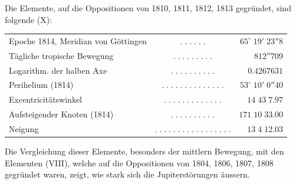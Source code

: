 \par\indent Die Elemente, auf die Oppositionen von 1810, 1811, 1812, 1813 gegründet, sind folgende (X):
\begin{center}\fontsize{9}{11}\selectfont\setlength{\tabcolsep}{2pt}\renewcommand{\arraystretch}{1.15}\begin{tabular}{lcr}
Epoche 1814, Meridian von Göttingen & $.\;.\;.\;.\;.\;.$ & $65^\circ\;19'\;23''8$\\
Tägliche tropische Bewegung & $.\;.\;.\;.\;.\;.\;.\;.\;.$ & $812''709$\\
Logarithm. der halben Axe & $.\;.\;.\;.\;.\;.\;.\;.\;.\;.$ & $0.4267631$\\
Perihelium (1814) & $.\;.\;.\;.\;.\;.\;.\;.\;.\;.\;.\;.\;.\;.$ & $53^\circ\;10'\;0''40$\\
Excentricitätswinkel & $.\;.\;.\;.\;.\;.\;.\;.\;.\;.\;.\;.\;.$ & $14\;43\;7.97$\\
Aufsteigender Knoten (1814) & $.\;.\;.\;.\;.\;.\;.\;.\;.\;.$ & $171\;10\;33.00$\\
Neigung & $.\;.\;.\;.\;.\;.\;.\;.\;.\;.\;.\;.\;.\;.\;.\;.\;.$ & $13\;4\;12.03$\\
\end{tabular}\end{center}
\par\indent Die Vergleichung dieser Elemente, besonders der mittlern Bewegung, mit den Elementen (VIII),
welche auf die Oppositionen von 1804, 1806, 1807, 1808 gegründet waren, zeigt, wie stark
sich die Jupiterstörungen äussern.

